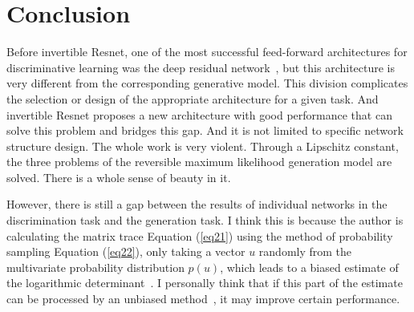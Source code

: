 \documentclass[final]{cvpr}
\begin{document}
\section{Conclusion}
Before invertible Resnet, one of the most successful feed-forward architectures for discriminative learning was the deep residual network~\cite{he2016deep}, but this architecture is very different from the corresponding generative model. This division complicates the selection or design of the appropriate architecture for a given task. And invertible Resnet proposes a new architecture with good performance that can solve this problem and bridges this gap. And it is not limited to specific network structure design. The whole work is very violent. Through a Lipschitz constant, the three problems of the reversible maximum likelihood generation model are solved. There is a whole sense of beauty in it.

However, there is still a gap between the results of individual networks in the discrimination task and the generation task. I think this is because the author is calculating the matrix trace Equation (\ref{eq21}) using the method of probability sampling Equation (\ref{eq22}), only taking a vector $u$ randomly from the multivariate probability distribution $p( u)$, which leads to a biased estimate of the logarithmic determinant~\cite{han2018stochastic}. I personally think that if this part of the estimate can be processed by an unbiased method~\cite{anil2019sorting}, it may improve certain performance.







{\small



}
\end{document}
